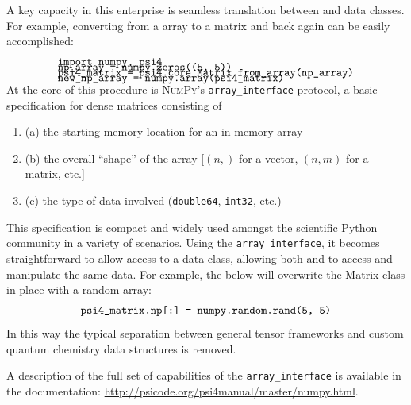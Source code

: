 A key capacity in this enterprise is seamless translation between \numpy and \pfour data classes. For example, converting from a \numpy array to a \pfour matrix and back again can be easily accomplished:
\begin{eqnarray}
  \begin{aligned}
    &\verb!import numpy, psi4! \\[-10pt]
    &\verb!np_array = numpy.zeros((5, 5))! \\[-10pt]
    &\verb!psi4_matrix = psi4.core.Matrix.from_array(np_array)! \\[-10pt]
    &\verb!new_np_array = numpy.array(psi4_matrix)! \\[-10pt]
  \end{aligned}
  \label{snip:np2p42np}
\end{eqnarray}
At the core of this procedure is \textsc{NumPy}'s {\tt array\_interface}\cite{array_interface} protocol, a basic specification for dense matrices consisting of
\begin{enumerate}
\item (a) the starting memory location for an in-memory array
\item (b) the overall ``shape'' of the array [$(n,)$ for a vector, $(n,m)$ for a matrix, etc.]
\item (c) the type of data involved (\texttt{double64}, \texttt{int32}, etc.)
\end{enumerate}
This specification is compact and widely used amongst the scientific Python community in a variety of scenarios. Using the {\tt array\_interface}, it becomes straightforward to allow \numpy access to a \pfour data class, allowing both \pfour and \numpy to access and manipulate the same data. For example, the below will overwrite the \pfour Matrix class in place with a random \numpy array:
\begin{eqnarray}
  \begin{aligned}
    &\verb!psi4_matrix.np[:] = numpy.random.rand(5, 5)! \\
  \end{aligned}
  \label{snip:numpy_set}
\end{eqnarray}
In this way the typical separation between general tensor frameworks and custom quantum chemistry data structures is removed.

A description of the full set of capabilities of the {\tt array\_interface} is available in the \pfour documentation: \url{http://psicode.org/psi4manual/master/numpy.html}.

